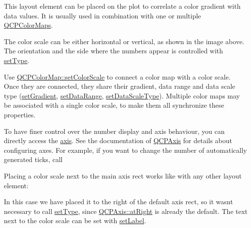 This layout element can be placed on the plot to correlate a color gradient with data values. It is usually used in combination with one or multiple \hyperlink{classQCPColorMap}{Q\+C\+P\+Color\+Maps}.



The color scale can be either horizontal or vertical, as shown in the image above. The orientation and the side where the numbers appear is controlled with \hyperlink{classQCPColorScale_a1bf9bdb291927c422dd66b404b206f1f}{set\+Type}.

Use \hyperlink{classQCPColorMap_aa828921db364fe3c6af4619580ab85fd}{Q\+C\+P\+Color\+Map\+::set\+Color\+Scale} to connect a color map with a color scale. Once they are connected, they share their gradient, data range and data scale type (\hyperlink{classQCPColorScale_a1f29583bb6f1e7f473b62fb712be3940}{set\+Gradient}, \hyperlink{classQCPColorScale_abe88633003a26d1e756aa74984587fef}{set\+Data\+Range}, \hyperlink{classQCPColorScale_aeb6107d67dd7325145b2498abae67fc3}{set\+Data\+Scale\+Type}). Multiple color maps may be associated with a single color scale, to make them all synchronize these properties.

To have finer control over the number display and axis behaviour, you can directly access the \hyperlink{classQCPColorScale_a1205bd67c8a33d5818aac1f6eea016a4}{axis}. See the documentation of \hyperlink{classQCPAxis}{Q\+C\+P\+Axis} for details about configuring axes. For example, if you want to change the number of automatically generated ticks, call 
\begin{DoxyCodeInclude}
\end{DoxyCodeInclude}
 Placing a color scale next to the main axis rect works like with any other layout element\+: 
\begin{DoxyCodeInclude}
\end{DoxyCodeInclude}
In this case we have placed it to the right of the default axis rect, so it wasn\textquotesingle{}t necessary to call \hyperlink{classQCPColorScale_a1bf9bdb291927c422dd66b404b206f1f}{set\+Type}, since \hyperlink{classQCPAxis_ae2bcc1728b382f10f064612b368bc18aadf5509f7d29199ef2f263b1dd224b345}{Q\+C\+P\+Axis\+::at\+Right} is already the default. The text next to the color scale can be set with \hyperlink{classQCPColorScale_aee124ae8396320cacf8276e9a0fbb8ce}{set\+Label}.

